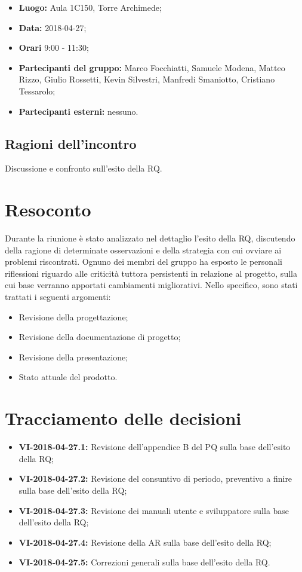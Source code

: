 \documentclass[openany,12pt,a4paper]{article}
\begin{document}
	\begin{itemize} 
	    \item \textbf{Luogo:} Aula 1C150, Torre Archimede;
	    \item \textbf{Data:} 2018-04-27;
	    \item \textbf{Orari} 9:00 - 11:30;
	    \item \textbf{Partecipanti del gruppo:} Marco Focchiatti, Samuele Modena, Matteo Rizzo, Giulio Rossetti, Kevin Silvestri, Manfredi Smaniotto, Cristiano Tessarolo;
	    \item \textbf{Partecipanti esterni:} nessuno.
	\end{itemize}
	
	\subsection{Ragioni dell'incontro}
	
	Discussione e confronto sull'esito della RQ.

	\section{Resoconto}
	
	Durante la riunione è stato analizzato nel dettaglio l'esito della RQ, discutendo della ragione di determinate osservazioni e della strategia con cui ovviare ai problemi riscontrati. Ognuno dei membri del gruppo ha esposto le personali riflessioni riguardo alle criticità tuttora persistenti in relazione al progetto, sulla cui base verranno apportati cambiamenti migliorativi. Nello specifico, sono stati trattati i seguenti argomenti:
	
	\begin{itemize}
		\item Revisione della progettazione;
		\item Revisione della documentazione di progetto;
		\item Revisione della presentazione;
		\item Stato attuale del prodotto.
	\end{itemize}  
	
	\section{Tracciamento delle decisioni}
	
	\begin{itemize}
	    \item \textbf{VI-2018-04-27.1:} Revisione dell'appendice B del PQ sulla base dell'esito della RQ;
	    \item \textbf{VI-2018-04-27.2:} Revisione del consuntivo di periodo, preventivo a finire sulla base dell'esito della RQ;
	    \item \textbf{VI-2018-04-27.3:} Revisione dei manuali utente e sviluppatore sulla base dell'esito della RQ;
	    \item \textbf{VI-2018-04-27.4:} Revisione della AR sulla base dell'esito della RQ;
	    \item \textbf{VI-2018-04-27.5:} Correzioni generali sulla base dell'esito della RQ.
	\end{itemize}	

	
\end{document}
